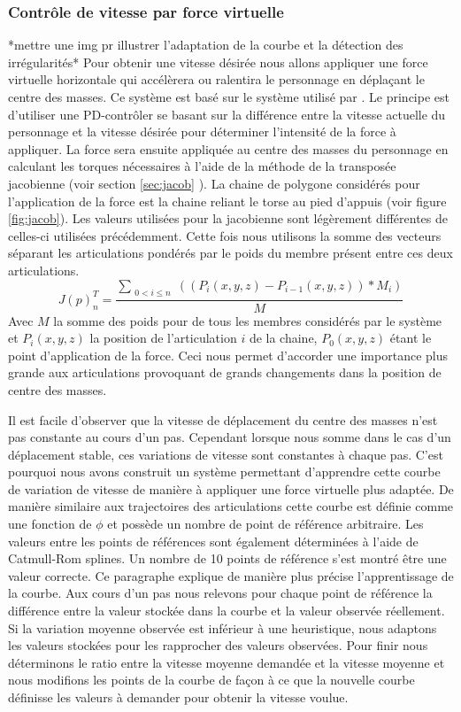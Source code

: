 \documentclass{llncs}
\begin{document}
\subsubsection{Contrôle de vitesse par force virtuelle}
%
\label{sec:speed_virt_force}
*mettre une img pr illustrer l'adaptation de la courbe et la détection des irrégularités*
Pour obtenir une vitesse désirée nous allons appliquer une force virtuelle horizontale qui accélèrera ou ralentira le personnage en déplaçant le centre des masses. Ce système est basé sur le système utilisé par \cite{coros2010generalized}.
Le principe est d'utiliser une PD-contrôler se basant sur la différence entre la vitesse actuelle du personnage et la vitesse désirée pour déterminer l'intensité de la force à appliquer. La force sera ensuite appliquée au centre des masses du personnage en calculant les torques nécessaires à l'aide de la méthode de la transposée jacobienne (voir section \ref{sec:jacob} ). La chaine de polygone considérés pour l'application de la force est la chaine reliant le torse au pied d'appuis (voir figure \ref{fig:jacob}). Les valeurs utilisées pour la jacobienne sont légèrement différentes de celles-ci utilisées précédemment. Cette fois nous utilisons la somme des vecteurs séparant les articulations pondérés par le poids du membre présent entre ces deux articulations.
\[
J(p) _n ^T =\frac{ \sum_{\substack{0<i\leq n}} ((P_i(x,y,z)-P_{i-1}(x,y,z))*M_i)}{M} 
\]
Avec \(M\) la somme des poids pour de tous les membres considérés par le système et \(P_i(x,y,z)\) la position de l'articulation \(i\) de la chaine, \(P_0(x,y,z)\) étant le point d'application de la force. Ceci nous permet d'accorder une importance plus grande aux articulations provoquant de grands changements dans la position de centre des masses. 

Il est facile d'observer que la vitesse de déplacement du centre des masses n'est pas constante au cours d'un pas. Cependant lorsque nous somme dans le cas d'un déplacement stable, ces variations de vitesse sont constantes à chaque pas. C'est pourquoi nous avons construit un système permettant d'apprendre cette courbe de variation de vitesse de manière à appliquer une force virtuelle plus adaptée. De manière similaire aux trajectoires des articulations cette courbe est définie comme une fonction de \(\phi\) et possède un nombre de point de référence arbitraire. Les valeurs entre les points de références sont également déterminées à l'aide de Catmull-Rom splines. Un nombre de 10 points de référence s'est montré être une valeur correcte.
Ce paragraphe explique de manière plus précise l'apprentissage de la courbe. Aux cours d'un pas nous relevons pour chaque point de référence la différence entre la valeur stockée dans la courbe et la valeur observée réellement. Si la variation moyenne observée est inférieur à une heuristique, nous adaptons les valeurs stockées pour les rapprocher des valeurs observées. Pour finir nous déterminons le ratio entre la vitesse moyenne demandée et la vitesse moyenne et nous modifions les points de la courbe de façon à ce que la nouvelle courbe définisse les valeurs à demander pour obtenir la vitesse voulue.
\end{document}
